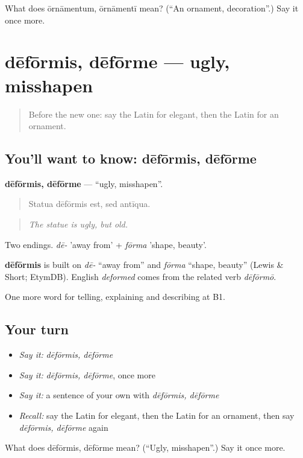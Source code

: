 \begin{tcolorbox}[breakable,colback=teal!4,colframe=teal!35!black,title={Before you move on}]
What does ōrnāmentum, ōrnāmentī mean? (\textquotedblleft{}An ornament, decoration\textquotedblright{}.) Say it once more.
\end{tcolorbox}
\section[dēfōrmis, dēfōrme]{dēfōrmis, dēfōrme — ugly, misshapen}

\label{lesson:LA-C548-deformis}



\begin{quote}
Before the new one: say the Latin for elegant, then the Latin for an ornament.
\end{quote}

\subsection*{You'll want to know: dēfōrmis, dēfōrme}
\textbf{dēfōrmis, dēfōrme} — \textquotedblleft{}ugly, misshapen\textquotedblright{}.

\begin{quote}
Statua dēfōrmis est, sed antīqua.
\end{quote}

\begin{quote}
\emph{The statue is ugly, but old.}
\end{quote}

Two endings. \emph{dē-} 'away from' + \emph{fōrma} 'shape, beauty'.

\begin{cousinweb}
\textbf{dēfōrmis} is built on \emph{dē-} \textquotedblleft{}away from\textquotedblright{} and \emph{fōrma} \textquotedblleft{}shape, beauty\textquotedblright{} (Lewis \& Short; EtymDB). English \emph{deformed} comes from the related verb \emph{dēfōrmō}.
\end{cousinweb}

\begin{grammarlens}[title={What you've built}]
One more word for telling, explaining and describing at B1.
\end{grammarlens}

\subsection*{Your turn}
\begin{itemize}
\raggedright
  \item \emph{Say it:} \emph{dēfōrmis, dēfōrme}
  \item \emph{Say it:} \emph{dēfōrmis, dēfōrme}, once more
  \item \emph{Say it:} a sentence of your own with \emph{dēfōrmis, dēfōrme}
  \item \emph{Recall:} say the Latin for elegant, then the Latin for an ornament, then say \emph{dēfōrmis, dēfōrme} again
\end{itemize}

\begin{tcolorbox}[breakable,colback=teal!4,colframe=teal!35!black,title={Before you move on}]
What does dēfōrmis, dēfōrme mean? (\textquotedblleft{}Ugly, misshapen\textquotedblright{}.) Say it once more.
\end{tcolorbox}
